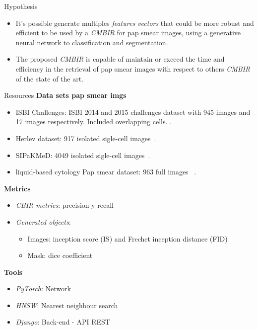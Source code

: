 \documentclass[xcolor=dvipsnames]{beamer}
\begin{document}
    \begin{frame}{Hypothesis}
        \begin{tcolorbox}[colback=green!5,colframe=LimeGreen,title=Hypothesis]
        \begin{itemize}
            \item It's possible generate multiples \textit{features vectors} that could be more robust and efficient to be used by a \textit{CMBIR} for pap smear images, using  a generative neural network to classification and segmentation. 
            \item The proposed \textit{CMBIR} is capable of maintain or exceed the time and efficiency in the retrieval of pap smear images with respect to others \textit{CMBIR} of the state of the art.
        \end{itemize}
        \end{tcolorbox}
    \end{frame}

    \begin{frame}{Resources}
    \textbf{Data sets pap smear imgs}
    \begin{itemize}
        \item ISBI Challenges: ISBI 2014 and 2015 challenges dataset with 945 images and 17 images respectively. Included overlapping cells.
        \cite{7005499}\cite{Lu2017}.
        \item Herlev dataset: 917 isolated sigle-cell images~\cite{Marinakis2009}\cite{Dounias2006AutomatedIO}\cite{asljkhdjaskdj}\cite{86c7f5c1a9f84a7484731dd71671c563}.
        \item SIPaKMeD: 4049 isolated sigle-cell images~\cite{8451588}.
        \item liquid-based cytology Pap smear dataset: 963 full images ~\cite{Hussain2020}.
    \end{itemize}\vspace{5mm}

    \textbf{Metrics}
    \begin{itemize}
        \item \textit{CBIR metrics}: precision y recall
        \item \textit{Generated objects}:
        \begin{itemize}
            \item Images: inception score (IS) and Frechet inception distance (FID)
            \item Mask: dice coefficient
        \end{itemize}
    \end{itemize}

    \textbf{Tools}
    \begin{itemize}
        \item \textit{PyTorch}: Network
        \item \textit{HNSW}: Nearest neighbour search
        \item \textit{Django}: Back-end - API REST
    \end{itemize}
    \end{frame}
\end{document}
